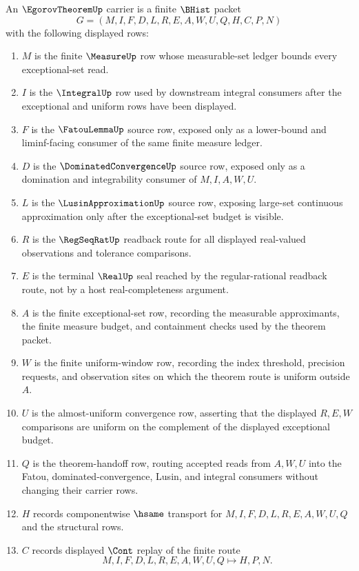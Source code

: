 \begin{definition}
\label{def:egorov-theorem-carrier}
An $\EgorovTheoremUp$ carrier is a finite $\BHist$ packet
$$
G=(M,I,F,D,L,R,E,A,W,U,Q,H,C,P,N)
$$
with the following displayed rows:
\begin{enumerate}
\item $M$ is the finite $\MeasureUp$ row whose measurable-set ledger bounds every exceptional-set read.
\item $I$ is the $\IntegralUp$ row used by downstream integral consumers after the exceptional and uniform rows have been displayed.
\item $F$ is the $\FatouLemmaUp$ source row, exposed only as a lower-bound and liminf-facing consumer of the same finite measure ledger.
\item $D$ is the $\DominatedConvergenceUp$ source row, exposed only as a domination and integrability consumer of $M,I,A,W,U$.
\item $L$ is the $\LusinApproximationUp$ source row, exposing large-set continuous approximation only after the exceptional-set budget is visible.
\item $R$ is the $\RegSeqRatUp$ readback route for all displayed real-valued observations and tolerance comparisons.
\item $E$ is the terminal $\RealUp$ seal reached by the regular-rational readback route, not by a host real-completeness argument.
\item $A$ is the finite exceptional-set row, recording the measurable approximants, the finite measure budget, and containment checks used by the theorem packet.
\item $W$ is the finite uniform-window row, recording the index threshold, precision requests, and observation sites on which the theorem route is uniform outside $A$.
\item $U$ is the almost-uniform convergence row, asserting that the displayed $R,E,W$ comparisons are uniform on the complement of the displayed exceptional budget.
\item $Q$ is the theorem-handoff row, routing accepted reads from $A,W,U$ into the Fatou, dominated-convergence, Lusin, and integral consumers without changing their carrier rows.
\item $H$ records componentwise $\hsame$ transport for $M,I,F,D,L,R,E,A,W,U,Q$ and the structural rows.
\item $C$ records displayed $\Cont$ replay of the finite route
$$
M,I,F,D,L,R,E,A,W,U,Q \longmapsto H,P,N .
$$
\end{enumerate}
\end{definition}
